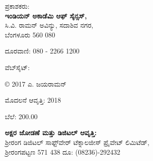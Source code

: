 

ಪ್ರಕಾಶಕರು:\\\textbf{ಇಂಡಿಯನ್ ಅಕಾಡೆಮಿ ಆಫ್ ಸೈನ್ಸಸ್,}\\
 ಸಿ.ವಿ. ರಾಮನ್ ಅವಿನ್ಯು, ಸದಾಶಿವ ನಗರ,\\
 ಬೆಂಗಳೂರು 560 080

ದೂರವಾಣಿ: 080 - 2266 1200

ವೆಬ್‍ಸೈಟ್: 

© 2017 ಎ. ಜಯರಾಮನ್

ಮೊದಲನೆ ಆವೃತ್ತಿ: 2018

ಬೆಲೆ: 200.00

 \textbf{ಅಕ್ಷರ ಜೋಡಣೆ ಮತ್ತು ಡಿಜಿಟಲ್ ಆವೃತ್ತಿ:}\\
 ಶ‍್ರೀರಂಗ ಡಿಜಿಟಲ್ ಸಾಫ್ಟ್‌ವೇರ್ ಟೆಕ್ನಾಲಜೀಸ್ ಪ್ರೈವೇಟ್ ಲಿಮಿಟೆಡ್,\\
 ಶ‍್ರೀರಂಗಪಟ್ಟಣ 571 438 ದೂ: (08236)-292432

